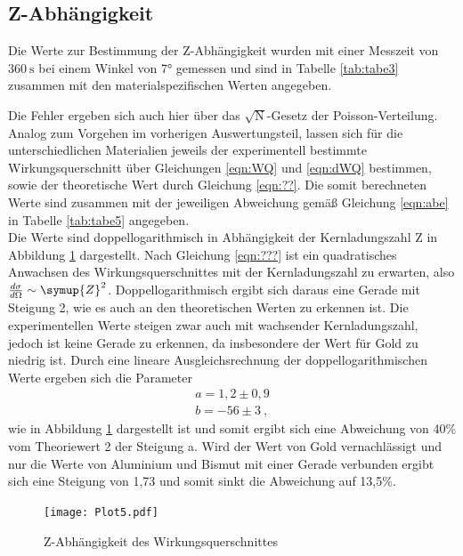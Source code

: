 \subsection{Z-Abhängigkeit}
Die Werte zur Bestimmung der Z-Abhängigkeit wurden mit einer Messzeit von $\SI{360}{\second}$
bei einem Winkel von 7° gemessen und sind in Tabelle
\ref{tab:tabe3} zusammen mit den materialspezifischen Werten angegeben.

Die Fehler ergeben sich auch hier über das $\sqrt{\text{N}}$-Gesetz der Poisson-Verteilung.
Analog zum Vorgehen im vorherigen Auswertungsteil, lassen sich für die unterschiedlichen
Materialien jeweils der experimentell bestimmte Wirkungsquerschnitt über Gleichungen \ref{eqn:WQ}
und \ref{eqn:dWQ} bestimmen, sowie der theoretische Wert durch Gleichung \ref{eqn:??}.
Die somit berechneten Werte sind zusammen mit der jeweiligen Abweichung gemäß
Gleichung \ref{eqn:abe} in Tabelle \ref{tab:tabe5}
angegeben.\\

Die Werte sind doppellogarithmisch in Abhängigkeit der Kernladungszahl Z in Abbildung \ref{fig:plot5}
dargestellt.
Nach Gleichung \ref{eqn:???} ist ein quadratisches Anwachsen des Wirkungsquerschnittes
mit der Kernladungszahl zu erwarten, also ${\frac{d\sigma}{d\Omega} \sim \symup{Z}^2}$.
Doppellogarithmisch ergibt sich daraus eine Gerade mit Steigung 2, wie es auch
an den theoretischen Werten zu erkennen ist. Die experimentellen Werte steigen zwar auch mit
wachsender Kernladungszahl, jedoch ist keine Gerade zu erkennen, da insbesondere der Wert für Gold
zu niedrig ist.
Durch eine lineare Ausgleichsrechnung der doppellogarithmischen Werte ergeben sich die Parameter
\begin{align*}
  a =  1,2 \pm 0,9 \\
  b =  -56 \pm 3 \: ,
\end{align*}
wie in Abbildung \ref{fig:plot5} dargestellt ist und somit ergibt sich eine Abweichung von 40\% vom Theoriewert 2 der Steigung a. Wird der Wert
von Gold vernachlässigt und nur die Werte von Aluminium und Bismut mit einer Gerade verbunden
ergibt sich eine Steigung von 1,73 und somit sinkt die Abweichung auf 13,5\%.
\begin{figure}
  \centering
  \texttt{[image: Plot5.pdf]}
  \caption{Z-Abhängigkeit des Wirkungsquerschnittes}
  \label{fig:plot5}
\end{figure}
